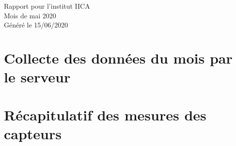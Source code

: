 \documentclass[12pt,a4paper]{article}
\begin{document}
	\begin{center}
		\huge Rapport pour l'institut IICA \\
		\vspace*{5pt}
		\LARGE Mois de mai 2020 \\
		\vspace*{0pt}
		\Large Généré le 15/06/2020
	\end{center}

	\vspace*{20pt}

	{
		\begin{spacing}{0.5}
		\tableofcontents
		\end{spacing}
	}
	\pagebreak

	\section{Collecte des données du mois par le serveur}


\pagebreak

\section{Récapitulatif des mesures des capteurs}


\pagebreak
\end{document}
